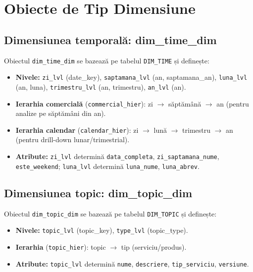 \chapter{Obiecte de Tip Dimensiune}
\label{sec:obiecte_dimensiune}

\section{Dimensiunea temporală: dim\_time\_dim}

Obiectul \texttt{dim\_time\_dim} se bazează pe tabelul \texttt{DIM\_TIME} și definește:

\begin{itemize}
    \item \textbf{Nivele:} \texttt{zi\_lvl} (date\_key), \texttt{saptamana\_lvl} (an, saptamana\_an), \texttt{luna\_lvl} (an, luna), \texttt{trimestru\_lvl} (an, trimestru), \texttt{an\_lvl} (an).
    \item \textbf{Ierarhia comercială} (\texttt{commercial\_hier}): zi $\rightarrow$ săptămână $\rightarrow$ an (pentru analize pe săptămâni din an).
    \item \textbf{Ierarhia calendar} (\texttt{calendar\_hier}): zi $\rightarrow$ lună $\rightarrow$ trimestru $\rightarrow$ an (pentru drill-down lunar/trimestrial).
    \item \textbf{Atribute:} \texttt{zi\_lvl} determină \texttt{data\_completa}, \texttt{zi\_saptamana\_nume}, \texttt{este\_weekend}; \texttt{luna\_lvl} determină \texttt{luna\_nume}, \texttt{luna\_abrev}.
\end{itemize}

\section{Dimensiunea topic: dim\_topic\_dim}

Obiectul \texttt{dim\_topic\_dim} se bazează pe tabelul \texttt{DIM\_TOPIC} și definește:

\begin{itemize}
    \item \textbf{Nivele:} \texttt{topic\_lvl} (topic\_key), \texttt{type\_lvl} (topic\_type).
    \item \textbf{Ierarhia} (\texttt{topic\_hier}): topic $\rightarrow$ tip (serviciu/produs).
    \item \textbf{Atribute:} \texttt{topic\_lvl} determină \texttt{nume}, \texttt{descriere}, \texttt{tip\_serviciu}, \texttt{versiune}.
\end{itemize}

